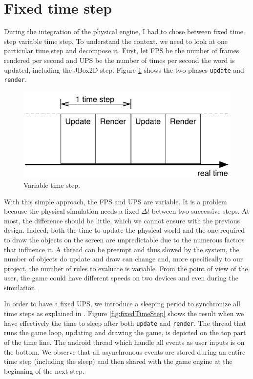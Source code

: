 \documentclass[11pt,a4paper]{article}
\begin{document}
\section{Fixed time step}
During the integration of the physical engine, I had to chose between fixed time step variable time step. To understand the context, we need to look at one particular time step and decompose it. First, let FPS be the number of frames rendered per second and UPS be the number of times per second the word is updated, including the JBox2D step. Figure \ref{fig:variableTimeStep} shows the two phases \texttt{update} and \texttt{render}. 

\begin{figure}[h]
\centering
\includegraphics[scale = 0.8]{images/variableTimeStep} 
\caption{Variable time step.}
\label{fig:variableTimeStep}
\end{figure}

With this simple approach, the FPS and UPS are variable. It is a problem because the physical simulation needs a fixed $\Delta t$ between two successive steps. At most, the difference should be little, which we cannot ensure with the previous design. Indeed, both the time to update the physical world and the one required to draw the objects on the screen are unpredictable due to the numerous factors that influence it. A thread can be preempt and thus slowed by the system, the number of objects do update and draw can change and, more specifically to our project, the number of rules to evaluate is variable. From the point of view of the user, the game could have different speeds on two devices and even during the simulation.

In order to have a fixed UPS, we introduce a sleeping period to synchronize all time steps as explained in \cite{FixYourTimestep, AndroidGameLoop}. Figure \ref{fig:fixedTimeStep} shows the result when we have effectively the time to sleep after both \texttt{update} and \texttt{render}. The thread that runs the game loop, updating and drawing the game, is depicted on the top part of the time line. The android thread which handle all events as user inputs is on the bottom. We observe that all asynchronous events are stored during an entire time step (including the sleep) and then shared with the game engine at the beginning of the next step.
\end{document}
